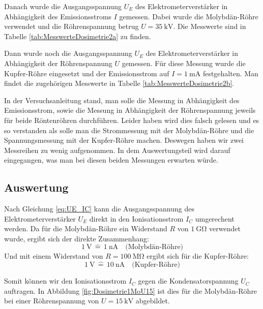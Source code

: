 \documentclass{article}
\begin{document}
Danach wurde die Ausgangsspannung $U_E$ des Elektrometerverstärker in Abhängigkeit des Emissionsstroms $I$ gemessen.
Dabei wurde die Molybdän-Röhre verwendet und die Röhrenspannung betrug $U = \SI{35}{\kilo\volt}$.
Die Messwerte sind in Tabelle \ref{tab:MesswerteDosimetrie2a} zu finden.

Dann wurde noch die Ausgangsspannung $U_E$ des Elektrometerverstärker in Abhängigkeit der Röhrenspannung $U$ gemessen.
Für diese Messung wurde die Kupfer-Röhre eingesetzt und der Emissionsstrom auf $I = \SI{1}{\milli\ampere}$ festgehalten.
Man findet die zugehörigen Messwerte in Tabelle \ref{tab:MesswerteDosimetrie2b}.

In der Versuchsanleitung stand, man solle die Messung in Abhängigkeit des Emissionsstrom, sowie die Messung in Abhängigkeit der Röhrenspannung jeweils für beide Röntenröhren durchführen.
Leider haben wird dies falsch gelesen und es so verstanden als solle man die Strommessung mit der Molybdän-Röhre und die Spannungsmessung mit der Kupfer-Röhre machen.
Deswegen haben wir zwei Messreihen zu wenig aufgenommen.
In dem Auswertungsteil wird darauf eingegangen, was man bei diesen beiden Messungen erwarten würde.

\subsection{Auswertung}

Nach Gleichung \ref{eq:UE_IC} kann die Ausgangsspannung des Elektrometerverstärker $U_E$ direkt in den Ionisationsstrom $I_C$ umgerechent werden.
Da für die Molybdän-Röhre ein Widerstand $R$ von $\SI{1}{\giga\ohm}$ verwendet wurde, ergibt sich der direkte Zusammenhang:
\begin{displaymath}
    \SI{1}{\volt} \,\widehat{=}\, \SI{1}{\nano\ampere} \quad \text{(Molybdän-Röhre)}
\end{displaymath}
Und mit einem Widerstand von $R = \SI{100}{\mega\ohm}$ ergibt sich für die Kupfer-Röhre:
\begin{displaymath}
    \SI{1}{\volt} \,\widehat{=}\, \SI{10}{\nano\ampere} \quad \text{(Kupfer-Röhre)}
\end{displaymath}

Somit können wir den Ionisationsstrom $I_C$ gegen die Kondensatorspannung $U_C$ auftragen.
In Abbildung \ref{fig:Dosimetrie1MoU15} ist dies für die Molybdän-Röhre bei einer Röhrenspannung von $U = \SI{15}{\kilo\volt}$ abgebildet.
\end{document}
